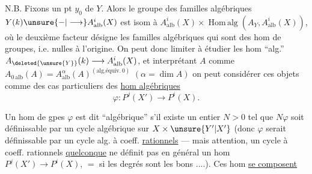 N.B. Fixons un pt $y_0$ de $Y$. Alors le groupe
des familles algébriques $Y(k)\unsure{-|\longrightarrow}A^i_{\mathrm{alb}}(X)$ est
isom à $A^i_{\mathrm{alb}}(X)\times\operatorname{Hom\,alg}(A_Y,A^i_{\mathrm{alb}}(X))$, où le
deuxième facteur désigne les familles algébriques
qui sont des hom de groupes, i.e. nulles à
l'origine. On peut donc  limiter à étudier
les hom ``alg.'' $A_{\deleted{\unsure{Y}}}(k)\longrightarrow A^i_{\mathrm{alb}}(X)$,  et interprétant
$A$ comme $A_{0\,\mathrm{alb}}(A)=A^\alpha_{\mathrm{alb}}(A)^{(\text{alg.équiv.}\,0)}$ $(\alpha=\dim A)$
on peut considérer  ces objets comme des
cas particuliers des \uline{hom algébriques}
\[
\varphi:P^j(X')\longrightarrow P^i(X).
\]

Un hom de gpes $\varphi$ est dit ``algébrique''
s'il existe un entier $N>0$ tel que
$N\varphi$ soit définissable par un cycle algébrique sur $X\times\unsure{Y'|X'}$
(donc $\varphi$ serait définissable par un cycle alg.
à coeff. \uline{rationnels} --- mais attention, un cycle
à coeff. rationnels \uline{quelconque} ne définit pas en
général un hom $P^j(X')\longrightarrow P^i(X)$, $=$ si les
degrés sont les bons ....). Ces hom \uline{se composent}

